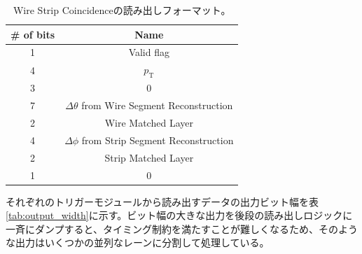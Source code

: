 \begin{table}[]
    \centering
    \caption[Wire Strip Coincidenceの読み出しフォーマット]{Wire Strip Coincidenceの読み出しフォーマット。}
    \label{tab:WS_format}
    \begin{tabular}{|c|c|}
    \hline
    \# of bits & Name                                            \\ \hline\hline
    1          & Valid flag                                      \\ \hline
    4          & $p_{\mathrm{T}}$                                \\ \hline
    3          & 0                                               \\ \hline
    7          & $\Delta\theta$ from Wire Segment Reconstruction \\ \hline
    2          & Wire Matched Layer                              \\ \hline
    4          & $\Delta\phi$ from Strip Segment Reconstruction \\ \hline
    2          & Strip Matched Layer                             \\ \hline
    1          & 0                                               \\ \hline
    \end{tabular}
\end{table}


それぞれのトリガーモジュールから読み出すデータの出力ビット幅を表\ref{tab:output_width}に示す。ビット幅の大きな出力を後段の読み出しロジックに一斉にダンプすると、タイミング制約を満たすことが難しくなるため、そのような出力はいくつかの並列なレーンに分割して処理している。

